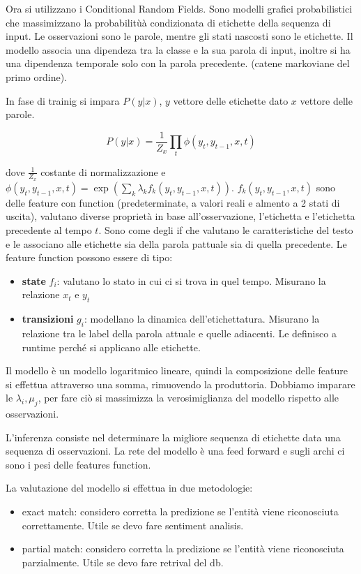 Ora si utilizzano i Conditional Random Fields. Sono modelli grafici probabilistici 
che massimizzano la probabilitùà condizionata di etichette della sequenza di input.
Le osservazioni sono le parole, mentre gli stati nascosti sono le etichette.
Il modello associa una dipendeza tra la classe e la sua parola di input, inoltre 
si ha una dipendenza temporale solo con la parola precedente. (catene markoviane del 
primo ordine).

In fase di trainig si impara $P(y|x)$, $y$ vettore delle etichette dato $x$ vettore 
delle parole.

$$P(y|x) = \frac{1}{Z_x} \prod_t \phi(y_t,y_{t-1},x ,t)$$

dove $ \frac{1}{Z_x}$ costante di normalizzazione e $\phi(y_t,y_{t-1},x ,t) = \exp (\sum_k\lambda_k f_k(y_t,y_{t-1},x,t))$.
$f_k(y_t,y_{t-1},x,t)$ sono delle feature con function (predeterminate, a  valori reali e almento a 2 stati di uscita), 
valutano diverse proprietà in base all'osservazione, l'etichetta e l'etichetta precedente al tempo $t$.
Sono come degli if che valutano le caratteristiche del testo e le associano alle etichette 
sia della parola pattuale sia di quella precedente. Le feature function possono essere di tipo:
\begin{itemize}
      \item \textbf{state} $f_i$: valutano lo stato in cui ci si trova in quel tempo.
      Misurano la relazione $x_t$ e $y_t$
      \item \textbf{transizioni} $g_i$: modellano la dinamica dell'etichettatura.
      Misurano la relazione tra le label della parola attuale e quelle adiacenti. 
      Le definisco a runtime perché si applicano alle etichette.
\end{itemize} 

Il modello è un modello logaritmico lineare, quindi la composizione delle feature 
si effettua attraverso una somma, rimuovendo la produttoria. Dobbiamo imparare 
le $\lambda_i, \mu_j$, per fare ciò si massimizza la verosimiglianza del modello 
rispetto alle osservazioni.

L'inferenza consiste nel determinare la migliore sequenza di etichette data una 
sequenza di osservazioni. La rete del modello è una feed forward e sugli archi ci 
sono i pesi delle features function.

La valutazione del modello si effettua in due metodologie:
\begin{itemize}
      \item exact match: considero corretta la predizione se l'entità viene riconosciuta 
      correttamente. Utile se devo fare sentiment analisis. 
      \item partial match: considero corretta la predizione se l'entità viene riconosciuta 
      parzialmente. Utile se devo fare retrival del db.
\end{itemize}

